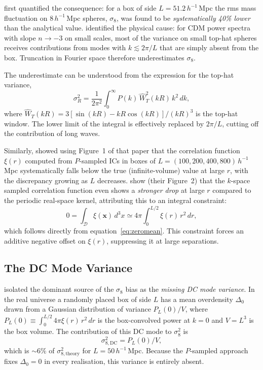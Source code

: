 \documentclass[12pt]{article}
\begin{document}
\citet{Gelb1994} first quantified the consequence: for a box of side
$L = 51.2\,h^{-1}$\,Mpc the rms mass fluctuation on $8\,h^{-1}$\,Mpc
spheres, $\sigma_8$, was found to be \emph{systematically 40\% lower}
than the analytical value.  \citet{Pen1997} identified the physical
cause: for CDM power spectra with slope $n \to -3$ on small scales,
most of the variance on small top-hat spheres receives contributions from
modes with $k \lesssim 2\pi/L$ that are simply absent from the box.
Truncation in Fourier space therefore underestimates $\sigma_8$.

The underestimate can be understood from the expression for the top-hat
variance,
\begin{equation}
  \sigma_R^2 = \frac{1}{2\pi^2}\int_0^\infty P(k)\,\hat{W}_T^2(kR)\,k^2\,dk,
\end{equation}
where $\hat{W}_T(kR) = 3[\sin(kR) - kR\cos(kR)]/(kR)^3$ is the
top-hat window.  The lower limit of the integral is effectively replaced
by $2\pi/L$, cutting off the contribution of long waves.

Similarly, \citet{Sirko2005} showed using Figure~1 of that paper that the
correlation function $\xi(r)$ computed from $P$-sampled ICs in boxes of
$L = (100, 200, 400, 800)\,h^{-1}$\,Mpc systematically falls below the
true (infinite-volume) value at large $r$, with the discrepancy growing
as $L$ decreases.  \citet{Hahn2011} show (their Figure~2) that the
$k$-space sampled correlation function even shows a \emph{stronger drop}
at large $r$ compared to the periodic real-space kernel, attributing this
to an integral constraint:
\begin{equation}
  0 = \int_\mathcal{D} \xi(\mathbf{x})\,d^3x
    \simeq 4\pi \int_0^{L/2} \xi(r)\,r^2\,dr,
  \label{eq:integralconstraint}
\end{equation}
which follows directly from equation~\eqref{eq:zeromean}.  This constraint
forces an additive negative offset on $\xi(r)$, suppressing it at large
separations.

\subsection{The DC Mode Variance}
\label{sec:dcmode}

\citet{Sirko2005} isolated the dominant source of the $\sigma_8$ bias as
the \emph{missing DC mode variance}.  In the real universe a randomly
placed box of side $L$ has a mean overdensity $\Delta_0$ drawn from a
Gaussian distribution of variance $P_L(0)/V$, where
$P_L(0) \equiv \int_0^{L/2} 4\pi\xi(r)\,r^2\,dr$ is the
box-convolved power at $k=0$ and $V = L^3$ is the box volume.  The
contribution of this DC mode to $\sigma_8^2$ is
\begin{equation}
  \sigma_{8,\mathrm{DC}}^2 = P_L(0)/V,
\end{equation}
which is $\sim 6\%$ of $\sigma_{8,\mathrm{theory}}^2$ for
$L = 50\,h^{-1}$\,Mpc.  Because the $P$-sampled approach fixes
$\Delta_0 = 0$ in every realisation, this variance is entirely absent.
\end{document}
